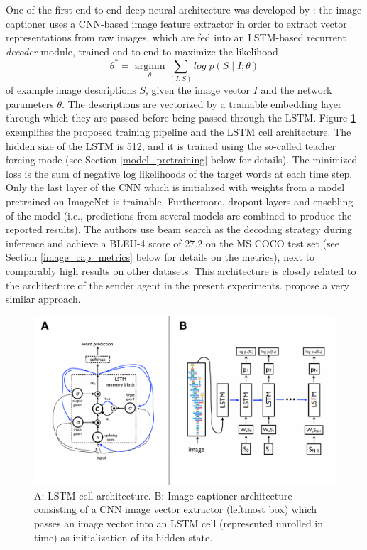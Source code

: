 One of the first end-to-end deep neural architecture was developed by \cite{vinyals2015show}: the image captioner uses a CNN-based image feature extractor in order to extract vector representations from raw images, which are fed into an LSTM-based recurrent \textit{decoder} module, trained end-to-end to maximize the likelihood 
\begin{equation}
\theta^* = \operatorname*{argmin}_\theta \sum_{(I, S)} log\; p(S \mid I; \theta) 
\end{equation}
of example image descriptions $S$, given the image vector $I$ and the network parameters $\theta$. The descriptions are vectorized by a trainable embedding layer through which they are passed before being passed through the LSTM. Figure \ref{fig:lstm} exemplifies the proposed training pipeline and the LSTM cell architecture. The hidden size of the LSTM is 512, and it is trained using the so-called teacher forcing mode (see Section \ref{model_pretraining} below for details). The minimized loss is the sum of negative log likelihoods of the target words at each time step. Only the last layer of the CNN which is initialized with weights from a model pretrained on ImageNet is trainable. Furthermore, dropout layers and ensebling of the model (i.e., predictions from several models are combined to produce the reported results). The authors use beam search as the decoding strategy during inference and achieve a BLEU-4 score of 27.2 on the MS COCO test set (see Section \ref{image_cap_metrics} below for details on the metrics), next to comparably high results on other datasets. 
This architecture is closely related to the architecture of the sender agent in the present experiments. \cite{donahue2015long} propose a very similar approach.

\begin{figure}
	\centering
	\includegraphics[width=\linewidth]{images/vinyals_lstm.pdf}
	\caption{A: LSTM cell architecture. B: Image captioner architecture consisting of a CNN image vector extractor (leftmost box) which passes an image vector into an LSTM cell (represented unrolled in time) as initialization of its hidden state. \parencite[][p. 2--3]{vinyals2015show}.}
	\label{fig:lstm}
\end{figure}

